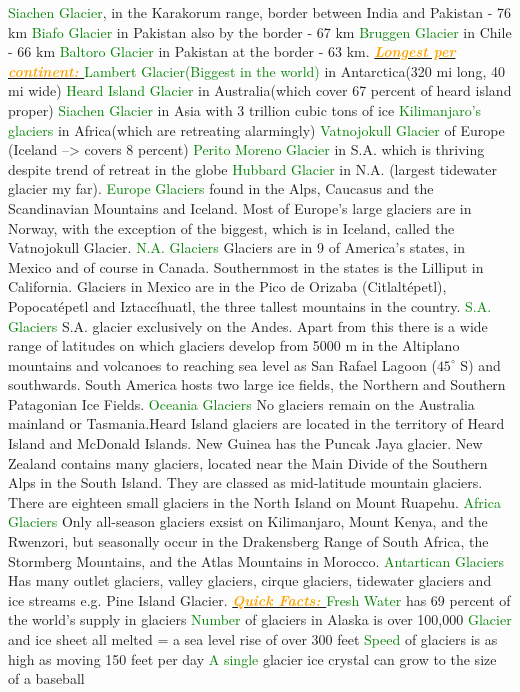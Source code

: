 \documentclass{article}
\newcommand{\green}[1]{\textcolor{green}{#1}}
\newcommand{\orange}[1]{\textcolor{orange}{#1}}
\newcommand{\mysub}[1]{\underline{\textbf{{\textit{\orange{#1}}}}}}
\newcommand{\mysubsub}[1]{{{\green{#1}}}}
\begin{document}
\begin{multicols*}{4}
		    \mysubsub {Siachen Glacier}, in the Karakorum range, border between India and Pakistan - 76 km
		    \mysubsub {Biafo Glacier} in Pakistan also by the border - 67 km
		    \mysubsub {Bruggen Glacier} in Chile - 66 km
		    \mysubsub {Baltoro Glacier} in Pakistan at the border - 63 km. \mysub{Longest per continent: } 
		    \mysubsub {Lambert Glacier(Biggest in the world)} in Antarctica(320 mi long, 40 mi wide)
		    \mysubsub {Heard Island Glacier} in Australia(which cover 67 percent of heard island proper)
		    \mysubsub {Siachen Glacier} in Asia with 3 trillion cubic tons of ice
		    \mysubsub {Kilimanjaro's glaciers} in Africa(which are retreating alarmingly)
		    \mysubsub {Vatnojokull Glacier} of Europe (Iceland --> covers 8 percent)
		    \mysubsub {Perito Moreno Glacier} in S.A. which is thriving despite trend of retreat in the globe
		    \mysubsub {Hubbard Glacier} in N.A. (largest tidewater glacier my far). 
		    \mysubsub{Europe Glaciers} found in the Alps, Caucasus and the Scandinavian Mountains and Iceland. Most of Europe's large glaciers are in Norway, with the exception of the biggest, which is in Iceland, called the Vatnojokull Glacier.
		    \mysubsub{N.A. Glaciers} Glaciers are in 9 of America's states, in Mexico and of course in Canada. Southernmost in the states is the Lilliput in California. Glaciers in Mexico are in the Pico de Orizaba (Citlaltépetl), Popocatépetl and Iztaccíhuatl, the three tallest mountains in the country.
		    \mysubsub{S.A. Glaciers} S.A. glacier exclusively on the Andes. Apart from this there is a wide range of latitudes on which glaciers develop from 5000 m in the Altiplano mountains and volcanoes to reaching sea level as San Rafael Lagoon ($ 45^\circ $ S) and southwards. South America hosts two large ice fields, the Northern and Southern Patagonian Ice Fields.
		    \mysubsub{Oceania Glaciers} No glaciers remain on the Australia mainland or Tasmania.Heard Island glaciers are located in the territory of Heard Island and McDonald Islands. New Guinea has the Puncak Jaya glacier. New Zealand contains many glaciers,  located near the Main Divide of the Southern Alps in the South Island. They are classed as mid-latitude mountain glaciers. There are eighteen small glaciers in the North Island on Mount Ruapehu.
		    \mysubsub{Africa Glaciers} Only all-season glaciers exsist on Kilimanjaro, Mount Kenya, and the Rwenzori, but seasonally occur in the Drakensberg Range of South Africa, the Stormberg Mountains, and the Atlas Mountains in Morocco.
		    \mysubsub{Antartican Glaciers} Has many outlet glaciers, valley glaciers, cirque glaciers, tidewater glaciers and ice streams e.g. Pine Island Glacier. 
		    \mysub{Quick Facts: }
		    \mysubsub{Fresh Water} has 69 percent of the world's supply in glaciers
		    \mysubsub{Number} of glaciers in Alaska is over 100,000
		    \mysubsub{Glacier} and ice sheet all melted = a sea level rise of over 300 feet
		    \mysubsub{Speed} of glaciers is as high as moving 150 feet per day
		    \mysubsub{A single} glacier ice crystal can grow to the size of a baseball
	\pagebreak
	

\end{multicols*}
\end{document}

